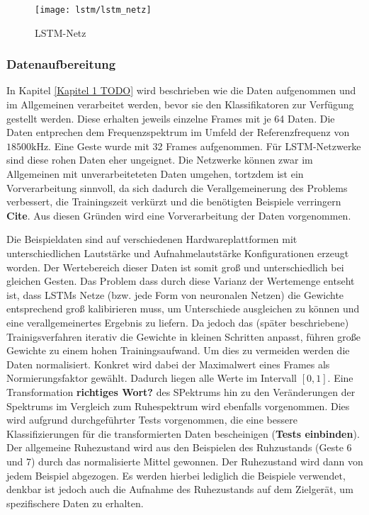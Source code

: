 \begin{figure}[htbp]
    \centering
   \texttt{[image: lstm/lstm\_netz]}
\caption{LSTM-Netz}
\label{fig:lstm_netz}
\end{figure}


\subsubsection{Datenaufbereitung}
\label{sec:lstm_data}

In Kapitel \ref{Kapitel 1 TODO} wird beschrieben wie die Daten aufgenommen und
im Allgemeinen verarbeitet werden, bevor sie den Klassifikatoren zur
Verfügung gestellt werden. Diese erhalten jeweils einzelne Frames mit je 64
Daten. Die Daten entprechen dem Frequenzspektrum im Umfeld der
Referenzfrequenz von $18500\text{kHz}$. Eine Geste wurde mit 32 Frames
aufgenommen. Für \ac{LSTM}-Netzwerke sind diese rohen Daten eher ungeignet. Die
Netzwerke können zwar im Allgemeinen mit unverarbeiteteten Daten umgehen,
tortzdem ist ein Vorverarbeitung sinnvoll, da sich dadurch die Verallgemeinerung
des Problems verbessert, die Trainingszeit verkürzt und die benötigten Beispiele
verringern \textbf{Cite}. Aus diesen Gründen wird eine Vorverarbeitung der Daten
vorgenommen. 

Die Beispieldaten sind auf verschiedenen Hardwareplattformen mit
unterschiedlichen Lautstärke und Aufnahmelautstärke Konfigurationen erzeugt
worden. Der Wertebereich dieser Daten ist somit groß und unterschiedlich bei
gleichen Gesten. Das Problem dass durch diese Varianz der Wertemenge entseht
ist, dass \acp{LSTM} Netze (bzw. jede Form von neuronalen Netzen) die Gewichte
entsprechend groß kalibirieren muss, um Unterschiede ausgleichen zu können und
eine verallgemeinertes Ergebnis zu liefern. Da jedoch das (später beschriebene)
Trainigsverfahren iterativ die Gewichte in kleinen Schritten anpasst, führen
große Gewichte zu einem hohen Trainingsaufwand. Um dies zu vermeiden werden die
Daten normalisiert. Konkret wird dabei der Maximalwert eines Frames als
Normierungsfaktor gewählt. Dadurch liegen alle Werte im Intervall $[0,1]$.
Eine Transformation \textbf{richtiges Wort?} des SPektrums hin zu den
Veränderungen der Spektrums im Vergleich zum Ruhespektrum wird ebenfalls
vorgenommen. Dies wird aufgrund durchgeführter Tests vorgenommen, die eine
bessere Klassifizierungen für die transformierten Daten bescheinigen
(\textbf{Tests einbinden}). Der allgemeine Ruhezustand wird aus den Beispielen
des Ruhzustands (Geste 6 und 7) durch das normalisierte Mittel gewonnen. Der
Ruhezustand wird dann von jedem Beispiel abgezogen. Es werden hierbei lediglich
die Beispiele verwendet, denkbar ist jedoch auch die Aufnahme des Ruhezustands
auf dem Zielgerät, um spezifischere Daten zu erhalten. 

